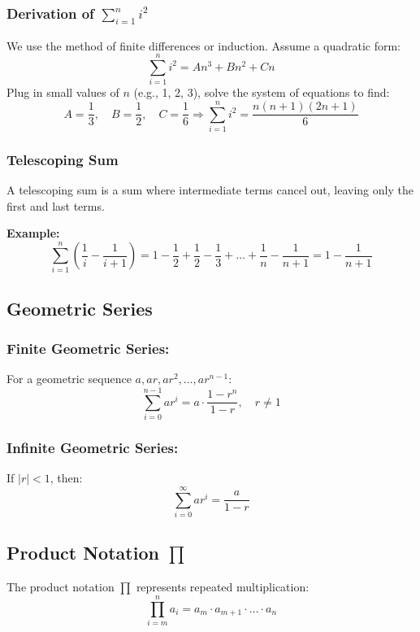 \subsubsection{Derivation of \texorpdfstring{\(\sum_{i=1}^{n} i^2\)}{∑i²}}

We use the method of finite differences or induction. Assume a quadratic form:
\[
\sum_{i=1}^{n} i^2 = An^3 + Bn^2 + Cn
\]
Plug in small values of \(n\) (e.g., 1, 2, 3), solve the system of equations to find:
\[
A = \frac{1}{3}, \quad B = \frac{1}{2}, \quad C = \frac{1}{6}
\Rightarrow \sum_{i = 1}^{n} i^2 = \frac{n(n+1)(2n+1)}{6}
\]

\subsubsection{Telescoping Sum}

A telescoping sum is a sum where intermediate terms cancel out, leaving only the first and last terms.

\textbf{Example:}
\[
\sum_{i=1}^{n} \left( \frac{1}{i} - \frac{1}{i+1} \right)
= 1 - \frac{1}{2} + \frac{1}{2} - \frac{1}{3} + \dots + \frac{1}{n} - \frac{1}{n+1}
= 1 - \frac{1}{n+1}
\]

\subsection{Geometric Series}

\subsubsection{Finite Geometric Series:}
For a geometric sequence \(a, ar, ar^2, \dots, ar^{n-1}\):
\[
\sum_{i = 0}^{n - 1} ar^i = a \cdot \frac{1 - r^n}{1 - r}, \quad r \ne 1
\]

\subsubsection{Infinite Geometric Series:}
If \(|r| < 1\), then:
\[
\sum_{i = 0}^{\infty} ar^i = \frac{a}{1 - r}
\]

\subsection{Product Notation \texorpdfstring{\(\prod\)}{∏}}

The product notation \(\prod\) represents repeated multiplication:
\[
\prod_{i = m}^{n} a_i = a_m \cdot a_{m+1} \cdot \dots \cdot a_n
\]


